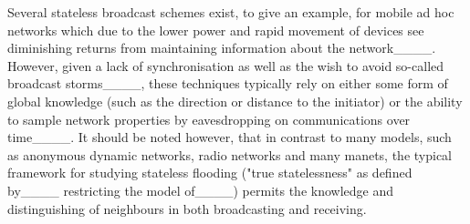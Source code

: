 Several stateless broadcast schemes exist, to give an example, for mobile ad hoc networks which due to the lower power and rapid movement of devices see diminishing returns from maintaining information about the network____. 
However, given a lack of synchronisation as well as the wish to avoid so-called broadcast storms____, these techniques typically rely on either some form of global knowledge (such as the direction or distance to the initiator) or the ability to sample network properties by eavesdropping on communications over time____.
It should be noted however, that in contrast to many models, such as anonymous dynamic networks, radio networks and many manets, the typical framework for studying stateless flooding ("true statelessness" as defined by____ restricting the model of____) permits the knowledge and distinguishing of neighbours in both broadcasting and receiving.


